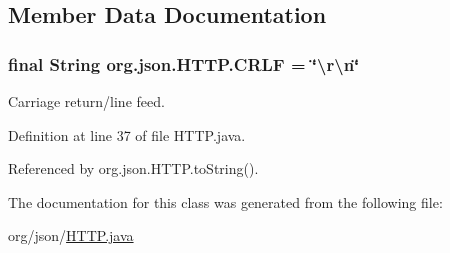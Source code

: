 \subsection{Member Data Documentation}
\hypertarget{classorg_1_1json_1_1_h_t_t_p_a7feb3304ccde0415ee29b8f997fb65b6}{
\subsubsection[{C\-R\-L\-F}]{\setlength{\rightskip}{0pt plus 5cm}final String org.\-json.\-H\-T\-T\-P.\-C\-R\-L\-F = \char`\"{}\textbackslash{}r\textbackslash{}n\char`\"{}\hspace{0.3cm}{\ttfamily [static]}}}\label{classorg_1_1json_1_1_h_t_t_p_a7feb3304ccde0415ee29b8f997fb65b6}
Carriage return/line feed. 

Definition at line 37 of file H\-T\-T\-P.\-java.



Referenced by org.\-json.\-H\-T\-T\-P.\-to\-String().



The documentation for this class was generated from the following file\-:\begin{DoxyCompactItemize}
\item 
org/json/\hyperlink{_h_t_t_p_8java}{H\-T\-T\-P.\-java}\end{DoxyCompactItemize}
